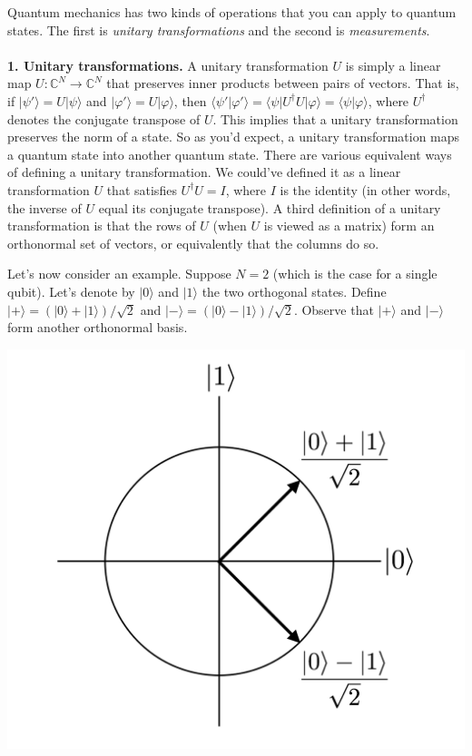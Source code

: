 \documentclass[11pt]{report}
\theoremstyle{plain}
\theoremstyle{definition}
\newcommand{\C}{{\mathbb C}}
\renewcommand{\bra}[1]{\langle#1|}
\renewcommand{\ket}[1]{|#1\rangle}
\newcommand{\braket}[2]{\langle#1|#2\rangle}
\begin{document}
Quantum mechanics has two kinds of operations that you can apply to quantum states. The first is \emph{unitary transformations} and the second is \emph{measurements}.
\\\\
\noindent
{\bf 1. Unitary transformations.} A unitary transformation $U$ is simply a linear map $U: \C^N \to \C^N$ that preserves inner products between pairs of vectors. That is, if $\ket{\psi'} = U \ket{\psi}$ and $\ket{\varphi'} = U\ket{\varphi}$, then $\braket{\psi'}{\varphi'} = \bra{\psi} U^\dagger U \ket{\varphi} = \braket{\psi}{\varphi}$, where $U^\dagger$ denotes the conjugate transpose of $U$. This implies that a unitary transformation preserves the norm of a state. So as you'd expect, a unitary transformation maps a quantum state into another quantum state. There are various equivalent ways of defining a unitary transformation. We could've defined it as a linear transformation $U$ that satisfies $U^\dagger U = I$, where $I$ is the identity (in other words, the inverse of $U$ equal its conjugate transpose). A third definition of a unitary transformation is that the rows of $U$ (when $U$ is viewed as a matrix) form an orthonormal set of vectors, or equivalently that the columns do so.

Let's now consider an example. Suppose $N = 2$ (which is the case for a single qubit). Let's denote by $\ket{0}$ and $\ket{1}$ the two orthogonal states. Define $\ket{+} = (\ket{0} + \ket{1})/\sqrt{2}$ and $\ket{-} = (\ket{0} - \ket{1})/\sqrt{2}$. Observe that $\ket{+}$ and $\ket{-}$ form another orthonormal basis.

\begin{center}
	\includegraphics[scale=0.35]{fig1}
\end{center}
\end{document}
